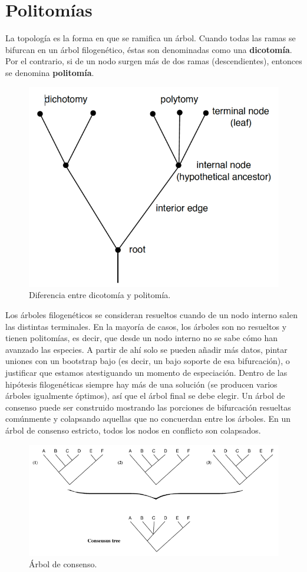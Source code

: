\section{Politomías}
La topología es la forma en que se ramifica un árbol. Cuando todas las ramas se bifurcan en un árbol filogenético, éstas son denominadas como una \textbf{dicotomía}. Por el contrario, si de un nodo surgen más de dos ramas (descendientes), entonces se denomina \textbf{politomía}.

\begin{figure}[htbp]
\centering
\includegraphics[width=0.3\linewidth]{figs/dichotomy-polytomy.png}
\caption{Diferencia entre dicotomía y politomía.}
\end{figure}

Los árboles filogenéticos se consideran resueltos cuando de un nodo interno salen las distintas terminales. En la mayoría de casos, los árboles son no resueltos y tienen politomías, es decir, que desde un nodo interno no se sabe cómo han avanzado las especies. A partir de ahí solo se pueden añadir más datos, pintar uniones con un bootstrap bajo (es decir, un bajo soporte de esa bifurcación), o justificar que estamos atestiguando un momento de especiación. Dentro de las hipótesis filogenéticas siempre hay más de una solución (se producen varios árboles igualmente óptimos), así que el árbol final se debe elegir. Un árbol de consenso puede ser construido mostrando las porciones de bifurcación resueltas comúnmente y colapsando aquellas que no concuerdan entre los árboles. En un árbol de consenso estricto, todos los nodos en conflicto son colapsados.

\begin{figure}[htbp]
\centering
\includegraphics[width=0.5\linewidth]{figs/consensus-tree.png}
\caption{Árbol de consenso.}
\end{figure}

